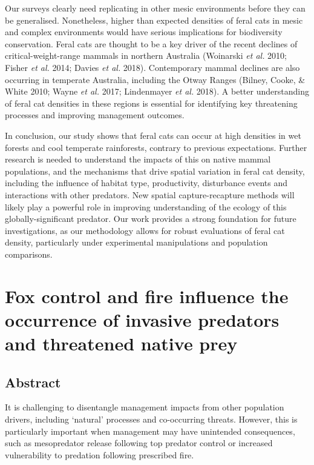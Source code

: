 \documentclass[11pt,a4paper,titlepage,twoside,openright]{style/unimelbthesis}
\begin{document}
\begin{mainmatter}
Our surveys clearly need replicating in other mesic environments before they can be generalised. Nonetheless, higher than expected densities of feral cats in mesic and complex environments would have serious implications for biodiversity conservation. Feral cats are thought to be a key driver of the recent declines of critical-weight-range mammals in northern Australia (Woinarski \emph{et al.} 2010; Fisher \emph{et al.} 2014; Davies \emph{et al.} 2018). Contemporary mammal declines are also occurring in temperate Australia, including the Otway Ranges (Bilney, Cooke, \& White 2010; Wayne \emph{et al.} 2017; Lindenmayer \emph{et al.} 2018). A better understanding of feral cat densities in these regions is essential for identifying key threatening processes and improving management outcomes.

In conclusion, our study shows that feral cats can occur at high densities in wet forests and cool temperate rainforests, contrary to previous expectations. Further research is needed to understand the impacts of this on native mammal populations, and the mechanisms that drive spatial variation in feral cat density, including the influence of habitat type, productivity, disturbance events and interactions with other predators. New spatial capture-recapture methods will likely play a powerful role in improving understanding of the ecology of this globally-significant predator. Our work provides a strong foundation for future investigations, as our methodology allows for robust evaluations of feral cat density, particularly under experimental manipulations and population comparisons.

\hypertarget{occ}{%
\chapter{Fox control and fire influence the occurrence of invasive predators and threatened native prey}\label{occ}}

\hypertarget{abstract-1}{%
\section*{Abstract}\label{abstract-1}}

It is challenging to disentangle management impacts from other population drivers, including `natural' processes and co-occurring threats. However, this is particularly important when management may have unintended consequences, such as mesopredator release following top predator control or increased vulnerability to predation following prescribed fire.


\end{mainmatter}
\end{document}
